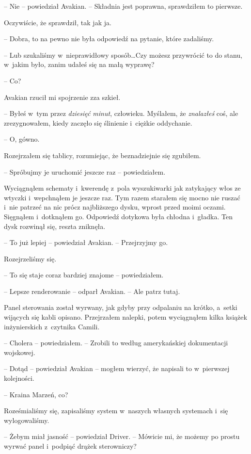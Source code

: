 \documentclass[oneside,polish,12pt,sfheadings]{mwbk}
\begin{document}
-- Nie -- powiedział Avakian. -- Składnia jest poprawna, sprawdziłem to
pierwsze.

Oczywiście, że sprawdził, tak jak ja.

-- Dobra, to na pewno nie była odpowiedź na pytanie, które zadaliśmy.

-- Lub szukaliśmy w~nieprawidłowy sposób\ldots Czy możesz przywrócić to do
stanu, w~jakim było, zanim udałeś się na małą wyprawę?

-- Co?

Avakian rzucił mi spojrzenie zza szkieł.

-- Byłeś w~tym przez \emph{dziesięć minut}, człowieku. Myślałem, że
\emph{znalazłeś} coś, ale zrezygnowałem, kiedy zaczęło się ślinienie i~ciężkie oddychanie.

-- O, gówno.

Rozejrzałem się tablicy, rozumiejąc, że beznadziejnie się zgubiłem.

-- Spróbujmy je uruchomić jeszcze raz -- powiedziałem.

Wyciągnąłem schematy i~kwerendę z~pola wyszukiwarki jak zatykający włos
ze wtyczki i~wepchnąłem je jeszcze raz. Tym razem starałem się mocno nie
ruszać i~nie patrzeć na nic prócz najbliższego dysku, wprost przed moimi
oczami. Sięgnąłem i~dotknąłem go. Odpowiedź dotykowa była chłodna i~gładka. Ten dysk rozwinął się, reszta zniknęła.

-- To już lepiej -- powiedział Avakian. -- Przejrzyjmy go.

Rozejrzeliśmy się.

-- To się staje coraz bardziej znajome -- powiedziałem.

-- Lepsze renderowanie -- odparł Avakian. -- Ale patrz tutaj.

Panel sterowania został wyrwany, jak gdyby przy odpalaniu na krótko, a~setki wijących się kabli opisano. Przejrzałem nalepki, potem wyciągnąłem
kilka książek inżynierskich z~czytnika Camili.

-- Cholera -- powiedziałem. -- Zrobili to według amerykańskiej dokumentacji
wojskowej.

-- Dotąd -- powiedział Avakian -- mogłem wierzyć, że napisali to w~pierwszej kolejności.

-- Kraina Marzeń, co?

Roześmialiśmy się, zapisaliśmy system w~naszych własnych systemach i~się
wylogowaliśmy.

-- Żebym miał jasność -- powiedział Driver. -- Mówicie mi, że możemy po
prostu wyrwać panel i~podpiąć drążek sterowniczy?
\end{document}
